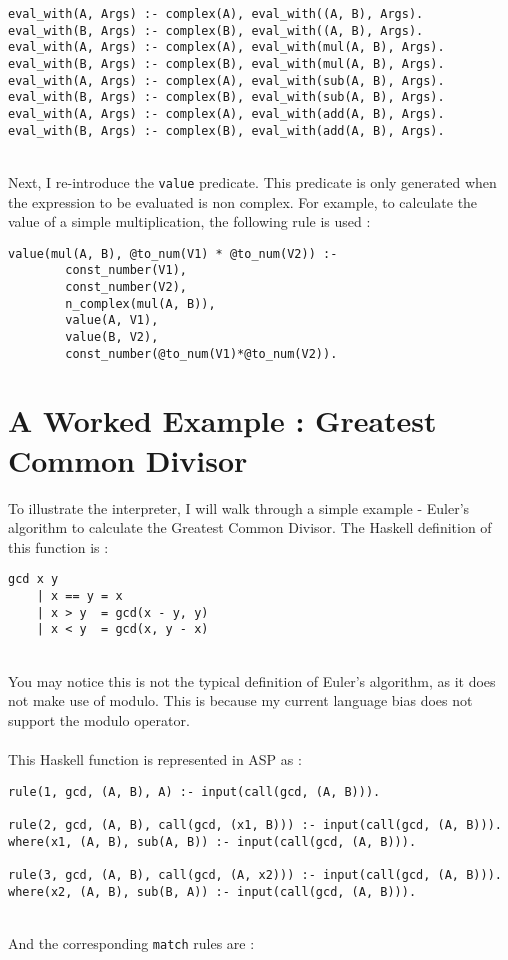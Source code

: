 \begin{lstlisting}[caption={Eval with modification}, label={lst:eval_mod}, firstnumber=78]
eval_with(A, Args) :- complex(A), eval_with((A, B), Args).
eval_with(B, Args) :- complex(B), eval_with((A, B), Args).
eval_with(A, Args) :- complex(A), eval_with(mul(A, B), Args).
eval_with(B, Args) :- complex(B), eval_with(mul(A, B), Args).
eval_with(A, Args) :- complex(A), eval_with(sub(A, B), Args).
eval_with(B, Args) :- complex(B), eval_with(sub(A, B), Args).
eval_with(A, Args) :- complex(A), eval_with(add(A, B), Args).
eval_with(B, Args) :- complex(B), eval_with(add(A, B), Args).
\end{lstlisting}
\mbox{}\\
Next, I re-introduce the \lstinline!value! predicate. This predicate is only generated when the expression to be evaluated is non complex. For example, to calculate the value of a simple multiplication, the following rule is used : 

\begin{lstlisting}[caption={Value with modification}, label={lst:value_mod}, firstnumber=69]
value(mul(A, B), @to_num(V1) * @to_num(V2)) :- 
		const_number(V1), 
		const_number(V2), 
		n_complex(mul(A, B)), 
		value(A, V1), 
		value(B, V2), 
		const_number(@to_num(V1)*@to_num(V2)).
\end{lstlisting}
\pagebreak

\section{A Worked Example : Greatest Common Divisor}

To illustrate the interpreter, I will walk through a simple example - Euler's algorithm to calculate the Greatest Common Divisor. The Haskell definition of this function is : \\

\begin{lstlisting}
gcd x y
	| x == y = x
	| x > y  = gcd(x - y, y)
	| x < y  = gcd(x, y - x)
\end{lstlisting}
\mbox{} \\
You may notice this is not the typical definition of Euler's algorithm, as it does not make use of modulo. This is because my current language bias does not support the modulo operator. \\ \\
This Haskell function is represented in ASP as :\\

\begin{lstlisting}
rule(1, gcd, (A, B), A) :- input(call(gcd, (A, B))).

rule(2, gcd, (A, B), call(gcd, (x1, B))) :- input(call(gcd, (A, B))).
where(x1, (A, B), sub(A, B)) :- input(call(gcd, (A, B))).

rule(3, gcd, (A, B), call(gcd, (A, x2))) :- input(call(gcd, (A, B))).
where(x2, (A, B), sub(B, A)) :- input(call(gcd, (A, B))).
\end{lstlisting}
\mbox{} \\
And the corresponding \lstinline{match} rules are :\\ %

